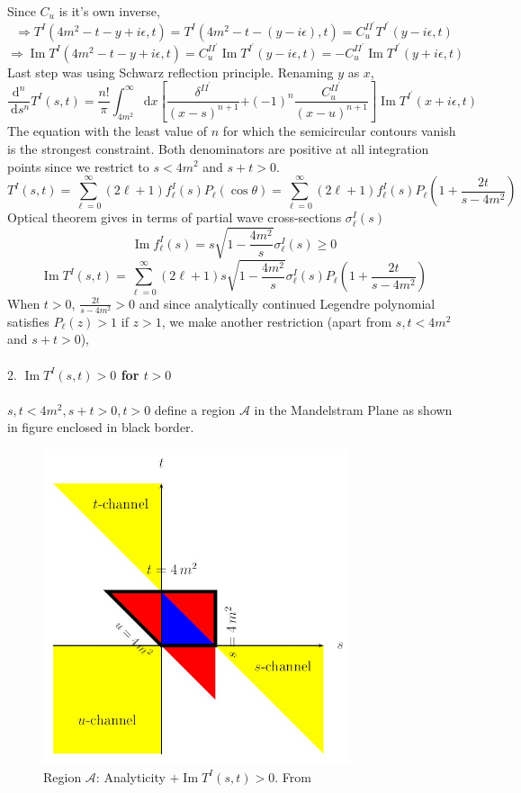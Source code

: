 ﻿\documentclass[12pt,a4paper]{article}
\begin{document}
Since $C_{u}$ is it's own inverse,
$$
\Rightarrow T^{I}(4m^{2}-t-y+i\epsilon, t)=T^{I}(4m^{2}-t-(y-i\epsilon), t)=C_{u}^{I I^{\prime}} T^{I^{\prime}}(y-i\epsilon, t)
$$
$$
\Rightarrow \operatorname{Im} T^{I}(4m^{2}-t-y+i\epsilon, t)=C_{u}^{I I^{\prime}} \operatorname{Im}T^{I^{\prime}}(y-i\epsilon, t)=-C_{u}^{I I^{\prime}} \operatorname{Im} T^{I^{\prime}}(y+i\epsilon, t)
$$
Last step was using Schwarz reflection principle. Renaming $y$ as $x$,
$$
\frac{\mathrm{d}^{n}}{\mathrm{~d} s^{n}} T^{I}(s, t)=\frac{n !}{\pi} \int_{4 m^{2}}^{\infty} \mathrm{d} x\left[\frac{\delta^{I I^{\prime}}}{(x-s)^{n+1}}\right. \left.+(-1)^{n} \frac{C_{u}^{I I^{\prime}}}{(x-u)^{n+1}}\right] \operatorname{Im} T^{I^{\prime}}(x+i \epsilon, t)
$$
The equation with the least value of $n$ for which the semicircular contours vanish is the strongest constraint. Both denominators are positive at all integration points since we restrict to $s<4 m^{2}$ and $s+t>0$.
$$T^{I}(s, t) =\sum_{\ell=0}^{\infty}(2 \ell+1) f_{\ell}^{I}(s) P_{\ell}(\cos \theta) =\sum_{\ell=0}^{\infty}(2 \ell+1) f_{\ell}^{I}(s) P_{\ell}\left(1+\frac{2 t}{s-4 m^{2}}\right)$$
Optical theorem gives in terms of partial wave cross-sections $\sigma_{\ell}^{I}(s)$
$$
\operatorname{Im} f_{\ell}^{I}(s)=s \sqrt{1-\frac{4 m^{2}}{s}} \sigma_{\ell}^{I}(s) \geq 0
$$
$$
\operatorname{Im} T^{I}(s, t)=\sum_{\ell=0}^{\infty}(2 \ell+1) s \sqrt{1-\frac{4 m^{2}}{s}} \sigma_{\ell}^{I}(s) P_{\ell}\left(1+\frac{2 t}{s-4 m^{2}}\right)
$$
When $t>0$, $\frac{2 t}{s-4 m^{2}}>0$ and since analytically continued Legendre polynomial satisfies $P_{\ell}(z)>1$ if $z>1$, we make another restriction (apart from $s,t<4m^{2}$ and $s+t>0$),\\\\
2. \textbf{$\operatorname{Im} T^{I}(s, t)>0$ for $t>0$}\\\\
$s,t<4m^{2}, s+t>0, t>0$ define a region $\mathcal{A}$ in the Mandelstram Plane as shown in figure enclosed in black border.
\begin{figure}[H]
  \centering
  \includegraphics[width=9cm]{10.jpg}
  \caption{Region $\mathcal{A}$: Analyticity $+ \operatorname{Im} T^{I}(s, t)>0$. From \cite{6}}
  \label{fig:1}
\end{figure}
\end{document}
